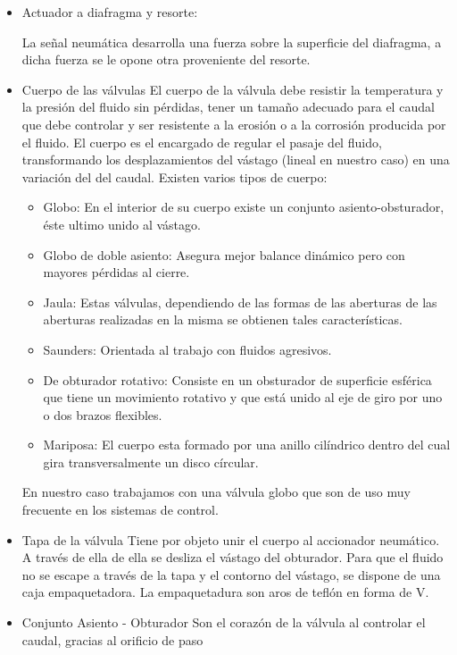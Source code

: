 \begin{itemize}
  \item Actuador a diafragma y resorte:
  
  La señal neumática desarrolla una fuerza sobre la superficie del diafragma, a 
  dicha fuerza se le opone otra proveniente del resorte.
  
  \item Cuerpo de las válvulas
  El cuerpo de la válvula debe resistir la temperatura y la presión del fluido
  sin pérdidas, tener un tamaño adecuado para el caudal que debe controlar y ser
  resistente a la erosión o a la corrosión producida por el fluido.
  El cuerpo es el encargado de regular el pasaje del fluido, transformando los
  desplazamientos del vástago (lineal en nuestro caso) en una variación del 
  del caudal.
  Existen varios tipos de cuerpo:
  \begin{itemize}
      \item Globo:
      En el interior de su cuerpo existe un conjunto asiento-obsturador, 
      éste ultimo unido al vástago.
      \item Globo de doble asiento:
      Asegura mejor balance dinámico pero con mayores pérdidas al cierre.
      \item Jaula:
      Estas válvulas, dependiendo de las formas de las aberturas de las aberturas
      realizadas en la misma se obtienen tales características.
      \item Saunders:
      Orientada al trabajo con fluidos agresivos.
      \item De obturador rotativo:
      Consiste en un obsturador de superficie esférica que tiene un movimiento
      rotativo y que está unido al eje de giro por uno o dos brazos flexibles.
      \item Mariposa:
      El cuerpo esta formado por una anillo cilíndrico dentro del cual gira
      transversalmente un disco círcular. 
    \end{itemize}
  En nuestro caso trabajamos con una válvula globo que son de uso muy frecuente 
  en los sistemas de control.
  \item Tapa de la válvula
  Tiene por objeto unir el cuerpo al accionador neumático. A través de ella de ella
  se desliza el vástago del obturador.
  Para que el fluido no se escape a través de la tapa y el contorno del vástago, 
  se dispone de una caja empaquetadora. La empaquetadura son aros de teflón en 
  forma de V.
  \item Conjunto Asiento - Obturador
  Son el corazón de la válvula al controlar el caudal, gracias al orificio de paso

\end{itemize}
